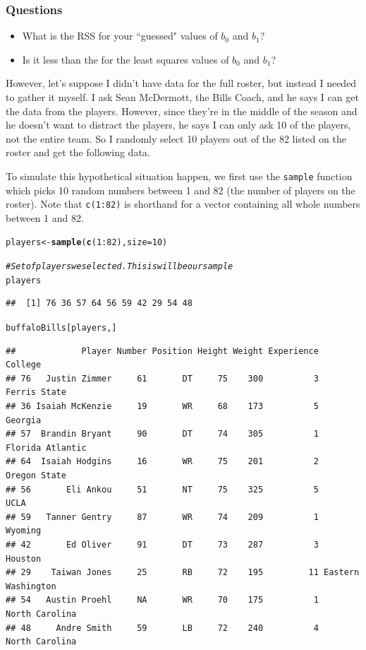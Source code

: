 \documentclass{article}\usepackage[]{graphicx}\usepackage[]{color}
\makeatletter
\newcommand{\hlnum}[1]{\textcolor[rgb]{0.686,0.059,0.569}{#1}}%
\newcommand{\hlcom}[1]{\textcolor[rgb]{0.678,0.584,0.686}{\textit{#1}}}%
\newcommand{\hlopt}[1]{\textcolor[rgb]{0,0,0}{#1}}%
\newcommand{\hlstd}[1]{\textcolor[rgb]{0.345,0.345,0.345}{#1}}%
\newcommand{\hlkwb}[1]{\textcolor[rgb]{0.69,0.353,0.396}{#1}}%
\newcommand{\hlkwc}[1]{\textcolor[rgb]{0.333,0.667,0.333}{#1}}%
\newcommand{\hlkwd}[1]{\textcolor[rgb]{0.737,0.353,0.396}{\textbf{#1}}}%
\newenvironment{kframe}{%
 \def\at@end@of@kframe{}%
 \ifinner\ifhmode%
  \def\at@end@of@kframe{\end{minipage}}%
  \begin{minipage}{\columnwidth}%
 \fi\fi%
 \def\FrameCommand##1{\hskip\@totalleftmargin \hskip-\fboxsep
 \colorbox{shadecolor}{##1}\hskip-\fboxsep
     \hskip-\linewidth \hskip-\@totalleftmargin \hskip\columnwidth}%
 \MakeFramed {\advance\hsize-\width
   \@totalleftmargin\z@ \linewidth\hsize
   \@setminipage}}%
 {\par\unskip\endMakeFramed%
 \at@end@of@kframe}
\newenvironment{knitrout}{}{} %
\makeatother
\begin{document}
\subsubsection*{Questions}
\begin{itemize}
\item What is the RSS for your ``guessed" values of $b_0$ and $b_1$?
\item Is it less than the  for the least squares values of $b_0$ and $b_1$?
\end{itemize}

However, let's suppose I didn't have data for the full roster, but instead I needed to gather it myself. I ask Sean McDermott, the Bills Coach, and he says I can get the data from the players. However, since they're in the middle of the season and he doesn't want to distract the players, he says I can only ask 10 of the players, not the entire team. So I randomly select 10 players out of the 82 listed on the roster and get the following data. 

To simulate this hypothetical situation happen, we first use the \texttt{sample} function which picks 10 random numbers between 1 and 82 (the number of players on the roster). Note that \texttt{c(1:82)} is shorthand for a vector containing all whole numbers between 1 and 82. 
\begin{knitrout}
\color{fgcolor}\begin{kframe}
\begin{alltt}
\hlstd{players} \hlkwb{<-} \hlkwd{sample}\hlstd{(}\hlkwd{c}\hlstd{(}\hlnum{1}\hlopt{:}\hlnum{82}\hlstd{),} \hlkwc{size} \hlstd{=} \hlnum{10}\hlstd{)}

\hlcom{# Set of players we selected. This is will be our sample}
\hlstd{players}
\end{alltt}
\begin{verbatim}
##  [1] 76 36 57 64 56 59 42 29 54 48
\end{verbatim}
\begin{alltt}
\hlstd{buffaloBills[players, ]}
\end{alltt}
\begin{verbatim}
##             Player Number Position Height Weight Experience            College
## 76   Justin Zimmer     61       DT     75    300          3       Ferris State
## 36 Isaiah McKenzie     19       WR     68    173          5            Georgia
## 57  Brandin Bryant     90       DT     74    305          1   Florida Atlantic
## 64  Isaiah Hodgins     16       WR     75    201          2       Oregon State
## 56       Eli Ankou     51       NT     75    325          5               UCLA
## 59   Tanner Gentry     87       WR     74    209          1            Wyoming
## 42       Ed Oliver     91       DT     73    287          3            Houston
## 29    Taiwan Jones     25       RB     72    195         11 Eastern Washington
## 54   Austin Proehl     NA       WR     70    175          1     North Carolina
## 48     Andre Smith     59       LB     72    240          4     North Carolina
\end{verbatim}
\end{kframe}
\end{knitrout}
\end{document}
